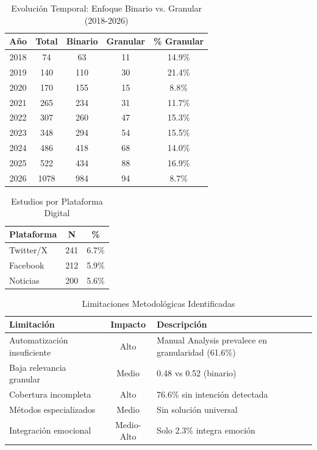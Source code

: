 \begin{table}[H]
\centering
\caption{Evolución Temporal: Enfoque Binario vs. Granular (2018-2026)}
\label{tab:latex_temporal}
\begin{tabular}{|c|c|c|c|c|}
\hline
\textbf{Año} & \textbf{Total} & \textbf{Binario} & \textbf{Granular} & \textbf{\% Granular} \\
\hline
2018 & 74 & 63 & 11 & 14.9\% \\
2019 & 140 & 110 & 30 & 21.4\% \\
2020 & 170 & 155 & 15 & 8.8\% \\
2021 & 265 & 234 & 31 & 11.7\% \\
2022 & 307 & 260 & 47 & 15.3\% \\
2023 & 348 & 294 & 54 & 15.5\% \\
2024 & 486 & 418 & 68 & 14.0\% \\
2025 & 522 & 434 & 88 & 16.9\% \\
2026 & 1078 & 984 & 94 & 8.7\% \\
\hline
\end{tabular}
\end{table}

\begin{table}[H]
\centering
\caption{Estudios por Plataforma Digital}
\label{tab:latex_plataformas}
\begin{tabular}{|l|c|c|}
\hline
\textbf{Plataforma} & \textbf{N} & \textbf{\%} \\
\hline
Twitter/X & 241 & 6.7\% \\
Facebook & 212 & 5.9\% \\
Noticias & 200 & 5.6\% \\
\hline
\end{tabular}
\end{table}

\begin{table}[H]
\centering
\caption{Limitaciones Metodológicas Identificadas}
\label{tab:latex_limitaciones}
\begin{tabular}{|l|c|p{5cm}|}
\hline
\textbf{Limitación} & \textbf{Impacto} & \textbf{Descripción} \\
\hline
Automatización insuficiente & Alto & Manual Analysis prevalece en granularidad (61.6\%) \\
\hline
Baja relevancia granular & Medio & 0.48 vs 0.52 (binario) \\
\hline
Cobertura incompleta & Alto & 76.6\% sin intención detectada \\
\hline
Métodos especializados & Medio & Sin solución universal \\
\hline
Integración emocional & Medio-Alto & Solo 2.3\% integra emoción \\
\hline
\end{tabular}
\end{table}

